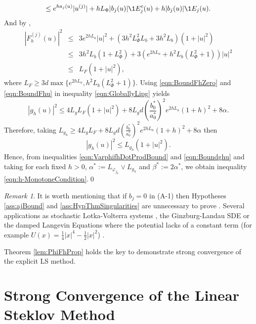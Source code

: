 \documentclass[sort&compress, preprint]{elsarticle}
\theoremstyle{definition}
\theoremstyle{plain}%
\theoremstyle{remark}
\newtheorem{remark}{Remark}[section]
\begin{document}
\begin{pf}
\begin{dmath*}
			\leq
			e^{h a_j(u)} |u^{(j)}| +
			h L_{\Phi} |b_j(u)| \1{E_j^c}(u) +h |b_j(u)| \1{E_j}(u).
	\end{dmath*}
	 And by ,
	\begin{eqnarray}
		|F_h^{(j)}(u)|^2 
		&\leq&
			3 e^{2h L_a }|u|^2 + (3 h^2 L_{\Phi}^2 L_b + 3h^ 2L_b) (1+|u|^2) \nonumber\\
		&\leq&
			3 h^2 L_b (1 + L_{\Phi}^2)   +
			3 \left(
				 e^{2 h L_a} + h^2 L_b (L_{\Phi}^2 + 1 ) 
			\right)|u|^2 \nonumber\\ &\leq& L_F(1+|u|^2), \label{eqn:BoundFhu}
	\end{eqnarray}
	where
	$L_F\geq 3 d \max\{e^{2h L_a},  h^2 L_b(L_{\Phi}^2+1)\}$.
	Using \eqref{eqn:BoundFhZero} and \eqref{eqn:BoundFhu} in  inequality \eqref{eqn:GloballyLipg} yields
	\begin{equation*}
		|g_h(u)|^2 \leq
			4 L_g L_F(1+|u|^2)
			+ 8 L_g d
			\left(
				\frac{b_0^*}{a_0^*}
			\right)^2
			e^{2h L_a} (1+h)^2
			+8 \alpha.
	\end{equation*}
	Therefore, taking
	$
		 L_{g_h} 
		 \geq 
			  4 L_g L_F + 8 L_g d
			  \left(
				  \frac{b_0^*}{a_0^*}
			  \right)^2
			  e^{2h L_a} (1+h)^2
			  +8 \alpha		  
	$
	then
	\begin{equation}\label{eqn:Boundghu}
		|g_h(u)|^2
		\leq
			L_{g_h}(1+|u|^2).		
	\end{equation}
	Hence, from inequalities \eqref{eqn:VarphifhDotProdBound} and \eqref{eqn:Boundghu} 
	and taking for each fixed $h>0$, $\alpha^* := L_{\varphi_{f_h}}\vee L_{g_h}$ and
	$\beta^* := 2\alpha^*$, we obtain inequality  \eqref{eqn:h-MonotoneCondition}.\qed
\end{pf}
%
\begin{remark}\label{rmk:PertrubedSDE}
	It is worth mentioning that if $b_j=0$ in (A-1) 
	then Hypotheses \ref{ass:ajBound} and \ref{ass:HypThmSingularities} are unnecessary to 
	prove . Several  applications  as  stochastic
	Lotka-Volterra systems \cite{Mao2002,Mao2003},  
	the Ginzburg-Landau SDE \cite{Kloeden1992} or
	the damped Langevin Equations where the potential lacks of a constant term 
	(for example $U(x) = \frac{1}{4}|x|^4 - \frac{1}{2}|x|^2$) \cite{Hutzenthaler2012a}.
\end{remark}

Theorem \ref{lem:PhiFhProp} holds the key to demonstrate strong convergence of the explicit LS method. 

\section{Strong Convergence of the Linear Steklov Method} 
\end{document}
